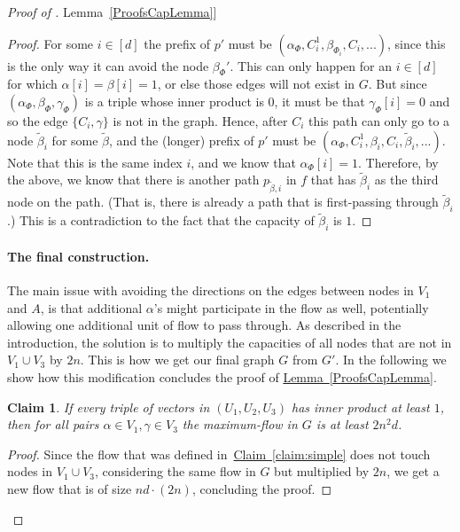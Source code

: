 \documentclass[11pt]{article}
\numberwithin{equation}{section}
\newtheorem{claim}[theorem]{Claim}
\theoremstyle{definition}
\theoremstyle{plain}
\newcommand{\expref}[2]{\hyperref[#2]{#1~\ref{#2}}}
\theoremstyle{plain}
\begin{document}
\begin{proof}[Proof of \expref{Lemma}{ProofsCapLemma}]
\begin{proof}
For some $i\in [d]$ the prefix of $p'$ must be $(\alpha_{\Phi}, C_i^1, \beta_{\Phi_i}, C_i,...)$, since this is the only way it can avoid the node ${\beta_{\Phi}}'$.
This can only happen for an $i \in [d]$ for which $\alpha[i]=\beta[i]=1$, or else those edges will not exist in $G$.
But since $(\alpha_{\Phi}, \beta_{\Phi}, \gamma_{\Phi})$ is a triple whose inner product is $0$, it must be that $\gamma_{\Phi} [i]=0$ and so the edge $\{C_i,\gamma\}$ is not in the graph.
%
Hence, after $C_i$ this path can only go to a node $\widetilde{\beta}_i$ for some $\widetilde{\beta}$, and the (longer) prefix of $p'$ must be $(\alpha_{\Phi}, C_i^1, \beta_i, C_i, {\widetilde{\beta}}_i ,...)$.
Note that this is the same index $i$, and we know that $\alpha_{\Phi} [i] =1$.
Therefore, by the above, we know that there is another path $p_{\widetilde{\beta},i}$ in $f$ that has ${\widetilde{\beta}}_i$ as the third node on the path.
(That is, there is already a path that is first-passing through ${\widetilde{\beta}}_i$.)
This is a contradiction to the fact that the capacity of ${\widetilde{\beta}}_i$ is $1$.
\end{proof}


\paragraph{The final construction.}

The main issue with avoiding the directions on the edges between nodes in $V_1$ and $A$, is that additional $\alpha$'s might participate in the flow as well, potentially allowing one additional unit of flow to pass through. As described in the introduction, the solution is to multiply the capacities of all nodes that are not in $V_1\cup V_3$ by $2n$. This is how we get our final graph $G$ from $G'$.
In the following we show how this modification concludes the proof of \expref{Lemma}{ProofsCapLemma}.


\begin{claim}\label{claim:first}
If every triple of vectors in $(U_1, U_2, U_3)$ has inner product at least $1$, then for all pairs $\alpha \in V_1,\gamma \in V_3$ the maximum-flow in $G$ is at least $2n^2d$.
\end{claim}
\begin{proof}
Since the flow that was defined in~\expref{Claim}{claim:simple} does not touch nodes in $V_1\cup V_3$, considering the same flow in $G$ but multiplied by $2n$, we get a new flow that is of size $nd\cdot(2n)$, concluding the proof.
\end{proof}


\end{proof}
\end{document}
